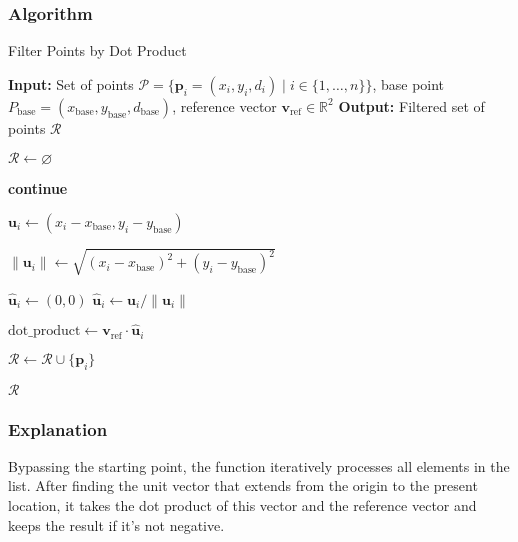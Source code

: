 \documentclass[12pt,a4paper]{report}
\begin{document}
\vspace*{\fill}\newpage
\subsubsection{Algorithm}
\begin{algorithm}
\caption{Filter Points by Dot Product}
\begin{algorithmic}[1]
\State \textbf{Input:} Set of points $\mathcal{P} = \{ \mathbf{p}_i = (x_i, y_i, d_i) \mid i \in \{1, \ldots, n\} \}$, base point $P_{\text{base}} = (x_{\text{base}}, y_{\text{base}}, d_{\text{base}})$, reference vector $\mathbf{v}_{\text{ref}} \in \mathbb{R}^2$
\State \textbf{Output:} Filtered set of points $\mathcal{R}$

\State $\mathcal{R} \gets \varnothing$

        \State \textbf{continue}
    \EndIf
    
    \State $\mathbf{u}_i \gets (x_i - x_{\text{base}}, y_i - y_{\text{base}})$
    
    \State $\|\mathbf{u}_i\| \gets \sqrt{(x_i - x_{\text{base}})^2 + (y_i - y_{\text{base}})^2}$
    
        \State $\hat{\mathbf{u}}_i \gets (0, 0)$
    \Else
        \State $\hat{\mathbf{u}}_i \gets \mathbf{u}_i / \|\mathbf{u}_i\|$
    \EndIf
    
    \State $\text{dot\_product} \gets \mathbf{v}_{\text{ref}} \cdot \hat{\mathbf{u}}_i$
    
        \State $\mathcal{R} \gets \mathcal{R} \cup \{\mathbf{p}_i\}$
    \EndIf
\EndFor

\State \Return $\mathcal{R}$
\end{algorithmic}
\end{algorithm}

\subsubsection{Explanation}
Bypassing the starting point, the function iteratively processes all elements in the list. After finding the unit vector that extends from the origin to the present location, it takes the dot product of this vector and the reference vector and keeps the result if it's not negative.
\end{document}
